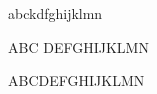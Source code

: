 \documentclass{article}
\begin{document}
	\textgreek{abckdfghijklmn}
	
\textgreek{ABC DEFGHIJKLMN}

\selectfont ABCDEFGHIJKLMN
	
\end{document}
